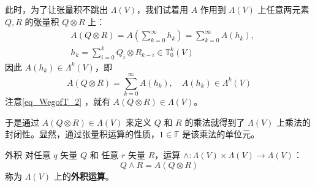 此时，为了让张量积不跳出 $\Lambda(V)$，我们试着用 $A$ 作用到 $\Lambda(V)$ 上任意两元素 $Q,R$ 的张量积 $Q\otimes R$ 上：
\begin{equation}
\begin{aligned}
&A(Q\otimes R)=A(\sum_{k=0}^\infty h_k)=\sum_{k=0}^\infty  A(h_k),\\
&h_k=\sum_{i=0}^k Q_i\otimes R_{k-i}\in\mathbb T_0^k(V)
\end{aligned}
\end{equation}
因此 $A(h_k)\in \Lambda^{k}(V)$，即
\begin{equation}
A(Q\otimes R)=\sum_{k=0}^\infty  A(h_k),\quad A(h_k)\in\Lambda^k(V)
\end{equation}
注意\autoref{eq_WegofT_2} ，就有 $A(Q\otimes R)\in\Lambda(V)$。

于是通过 $A(Q\otimes R)\in\Lambda(V)$ 来定义 $Q$ 和 $R$ 的乘法就得到了 $\Lambda(V)$ 上乘法的封闭性。显然，通过张量积运算的性质，$1\in\mathbb F$ 是该乘法的单位元。
\begin{definition}{外积}\label{def_WegofT_1}
对任意 $q$ 矢量 $Q$ 和 任意 $r$ 矢量 $R$，运算 $\wedge:\Lambda(V)\times\Lambda(V)\rightarrow\Lambda(V)$：
\begin{equation}
Q\wedge R=A(Q\otimes R)
\end{equation}
称为 $\Lambda(V)$ 上的\textbf{外积运算}。
\end{definition}
